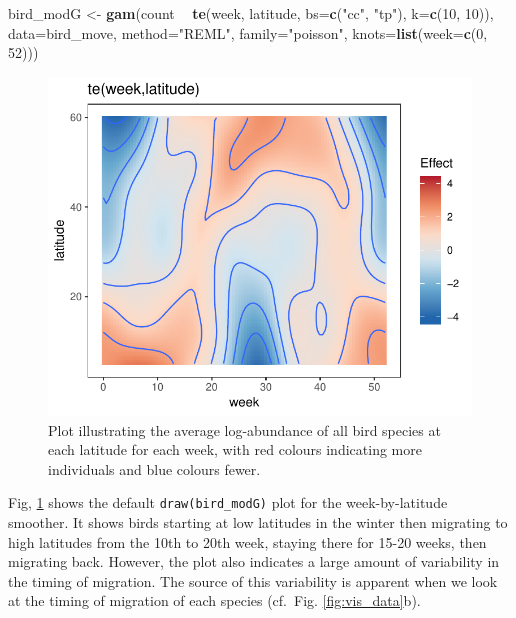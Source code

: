 \documentclass[12pt]{article}
\newenvironment{Shaded}{\begin{snugshade}}{\end{snugshade}}
\newcommand{\KeywordTok}[1]{\textcolor[rgb]{0.13,0.29,0.53}{\textbf{#1}}}
\newcommand{\DataTypeTok}[1]{\textcolor[rgb]{0.13,0.29,0.53}{#1}}
\newcommand{\DecValTok}[1]{\textcolor[rgb]{0.00,0.00,0.81}{#1}}
\newcommand{\StringTok}[1]{\textcolor[rgb]{0.31,0.60,0.02}{#1}}
\newcommand{\OperatorTok}[1]{\textcolor[rgb]{0.81,0.36,0.00}{\textbf{#1}}}
\newcommand{\NormalTok}[1]{#1}
\begin{document}
\begin{Shaded}
\begin{Highlighting}[]
\NormalTok{bird_modG <-}\StringTok{ }\KeywordTok{gam}\NormalTok{(count }\OperatorTok{~}\StringTok{ }\KeywordTok{te}\NormalTok{(week, latitude, }\DataTypeTok{bs=}\KeywordTok{c}\NormalTok{(}\StringTok{"cc"}\NormalTok{, }\StringTok{"tp"}\NormalTok{), }\DataTypeTok{k=}\KeywordTok{c}\NormalTok{(}\DecValTok{10}\NormalTok{, }\DecValTok{10}\NormalTok{)),}
                 \DataTypeTok{data=}\NormalTok{bird_move, }\DataTypeTok{method=}\StringTok{"REML"}\NormalTok{, }\DataTypeTok{family=}\StringTok{"poisson"}\NormalTok{,}
                 \DataTypeTok{knots=}\KeywordTok{list}\NormalTok{(}\DataTypeTok{week=}\KeywordTok{c}\NormalTok{(}\DecValTok{0}\NormalTok{, }\DecValTok{52}\NormalTok{)))}
\end{Highlighting}
\end{Shaded}

\begin{figure}
\centering
\includegraphics{../figures/bird_modG_plot-1.pdf}
\caption{\label{fig:bird_modG} Plot illustrating the average
log-abundance of all bird species at each latitude for each week, with
red colours indicating more individuals and blue colours fewer.}
\end{figure}

Fig, \ref{fig:bird_modG} shows the default \texttt{draw(bird\_modG)}
plot for the week-by-latitude smoother. It shows birds starting at low
latitudes in the winter then migrating to high latitudes from the 10th
to 20th week, staying there for 15-20 weeks, then migrating back.
However, the plot also indicates a large amount of variability in the
timing of migration. The source of this variability is apparent when we
look at the timing of migration of each species (cf.~Fig.
\ref{fig:vis_data}b).
\end{document}
